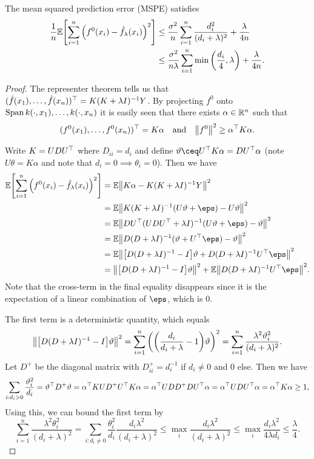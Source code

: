 \begin{theorem}
	The mean squared prediction error (MSPE) satisfies
	\begin{align*}
		\frac1n \mathbb E\qty[ \sum_{i=1}^n \qty(f^0(x_i) - \hat f_\lambda(x_i))^2] &\leq \frac{\sigma^2}{n} \sum_{i=1}^n \frac{d_i^2}{(d_i + \lambda)^2} + \frac\lambda{4n} \\
		&\leq \frac{\sigma^2}{n \lambda} \sum_{i=1}^n \min\qty(\frac{d_i}{4}, \lambda) + \frac{\lambda}{4n}. 
	\end{align*}
\end{theorem}

\begin{proof}
	The representer theorem tells us that $(\hat f(x_1), \dotsc, \hat f(x_n))^\top = K(K + \lambda I)^{-1} Y$. By projecting $f^0$ onto $\operatorname{Span}{k(\cdot, x_1), \dotsc, k(\cdot, x_n)}$ it is easily seen that there exists $\alpha \in \mathbb R^n$ such that
	\[
	(f^0(x_1), \dotsc, f^0(x_n))^\top = K\alpha \quad\text{and}\quad \norm{f^0}^2 \geq \alpha^\top K\alpha. 
	\]
	
	Write $K = UDU^\top$ where $D_{ii} = d_i$ and define $\theta \ceq U\T K\alpha = DU\T \alpha$ (note $U\theta = K\alpha$ and note that $d_i = 0 \implies \theta_i =0$). Then we have
	\begin{align*}
		 \EE\qty[ \sum_{i=1}^n \qty(f^0(x_i) - \hat f_\lambda(x_i))^2] &= \EE \norm{K\alpha - K(K + \lambda I)^{-1} Y}^2 \\
		 &= \EE \norm{K(K + \lambda I)^{-1} (U\theta + \eps) - U\theta}^2 \\
		 &= \EE\norm{DU\T (UDU\T + \lambda I)^{-1} (U\theta + \eps) - \theta}^2 \\
		 &= \EE \norm{D(D + \lambda I)^{-1} (\theta + U\T \eps) - \theta}^2 \\
		 &= \EE \norm{\qty[D(D + \lambda I)^{-1} - I]\theta + D(D + \lambda I)^{-1} U\T \eps}^2 \\
		 &= \norm{\qty[D(D + \lambda I)^{-1} - I]\theta}^2 + \EE \norm{D(D+ \lambda I)^{-1} U\T\eps}^2. 
	\end{align*}
Note that the cross-term in the final equality disappears since it is the  expectation of a linear combination of $\eps$, which is 0. 

The first term is a deterministic quantity, which equals
\[
\norm{\qty[D(D + \lambda I)^{-1} - I]\vartheta}^2 = \sum_{i=1}^n \qty(\qty(\frac{d_i}{d_i + \lambda} - 1)\vartheta)^2 = \sum_{i=1}^n \frac{\lambda^2\vartheta_i^2}{(d_i + \lambda)^2}. 
\]
Let $D^+$ be the diagonal matrix with $D_{ii}^+ = d_i^{-1}$ if $d_i \neq 0$ and 0 else. Then we have
\[
\sum_{i: d_i > 0} \frac{\vartheta_i^2}{d_i} = \vartheta^\top D^+\vartheta  = \alpha^\top K U D^+ U^\top K\alpha = \alpha^\top UDD^+ DU^\top \alpha = \alpha^\top UDU^\top \alpha = \alpha^\top K\alpha \geq 1,
\]
Using this, we can bound the first term by
\[
\sum_{i=1}^n \frac{\lambda^2\theta_i^2}{(d_i + \lambda)^2} = \sum_{i: d_i \neq 0} \frac{\theta_i^2}{d_i} \frac{d_i\lambda^2}{(d_i + \lambda)^2} \leq \max_i \frac{d_i \lambda^2}{(d_i + \lambda)^2} \leq \max_i \frac{d_i\lambda^2}{4 \lambda d_i} \leq\frac\lambda4. 
\]


\end{proof}
